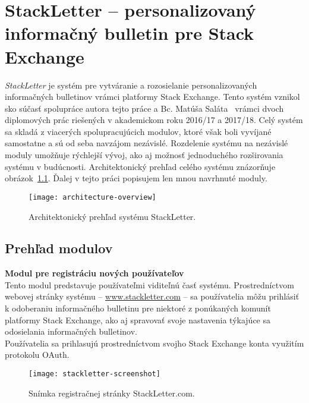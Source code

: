 \newpage
\chapter{StackLetter -- personalizovaný informačný bulletin pre Stack Exchange}

\textit{StackLetter} je systém pre vytváranie a rozosielanie personalizovaných informačných bulletinov vrámci platformy
Stack Exchange. Tento systém vznikol sko súčasť spolupráce autora tejto práce a Bc. Matúša Saláta~\cite{Salat2018} vrámci
dvoch diplomových prác riešených v akademickom roku 2016/17 a 2017/18. Celý systém sa skladá
z viacerých spolupracujúcich modulov, ktoré však boli vyvíjané samostatne a sú od seba navzájom nezávislé. Rozdelenie
systému na nezávislé moduly umožňuje rýchlejší vývoj, ako aj možnosť jednoduchého rozširovania systému v budúcnosti.
Architektonický prehľad celého systému znázorňuje obrázok~\ref{fig:architecutre-overview}. Ďalej v tejto práci popisujem
len mnou navrhnuté moduly.

\begin{figure}[H]\begin{center}
\texttt{[image: architecture-overview]}
\caption{Architektonický prehľad systému StackLetter. \label{fig:architecutre-overview}}\end{center}
\end{figure}

\section{Prehľad modulov}

\textbf{Modul pre registráciu nových používateľov}\\
Tento modul predstavuje používateľmi viditeľnú časť systému. Prostredníctvom webovej stránky systému
-- \url{www.stackletter.com} -- sa používatelia môžu prihlásiť k odoberaniu informačného bulletinu pre niektoré
z ponúkaných komunít platformy Stack Exchange, ako aj spravovať svoje nastavenia týkajúce sa odosielania informačných
bulletinov.\\
Používatelia sa prihlasujú prostredníctvom svojho Stack Exchange konta využitím protokolu OAuth.

\begin{figure}[H]\begin{center}
\texttt{[image: stackletter-screenshot]}
\caption{Snímka registračnej stránky StackLetter.com. \label{fig:stackletter.com}}\end{center}
\end{figure}

